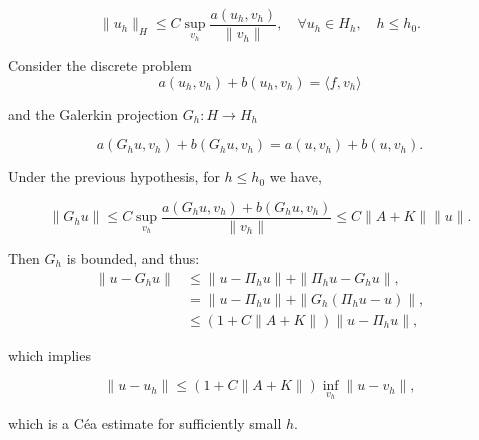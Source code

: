 \[\|u_h\|_H\leq C\sup_{v_h}\frac{a(u_h,v_h)}{\|v_h\|},\quad \forall u_h\in H_h, \quad h\leq h_0.\]

Consider the discrete problem
\[a(u_h,v_h) + b(u_h,v_h) = \langle f, v_h\rangle\]

and the Galerkin projection $G_h: H\to H_h$

\[a(G_hu, v_h) + b(G_hu, v_h) = a(u, v_h) + b(u,v_h).\]

Under the previous hypothesis, for $h\leq h_0$ we have, 

\[\|G_hu\|\leq C\sup_{v_h}\frac{a(G_hu, v_h) + b(G_hu, v_h)}{\|v_h\|}\leq C\|A+K\|\|u\|.\]

Then $G_h$ is bounded, and thus:
\begin{align*}
    \|u - G_hu\|&\leq \|u-\Pi_hu\| + \|\Pi_hu - G_hu\|,\\
    &= \|u-\Pi_hu\| + \|G_h(\Pi_hu - u)\|,\\
    &\leq (1+C\|A+K\|)\|u - \Pi_h u\|,
\end{align*}

which implies

\[\|u-u_h\|\leq (1+C\|A+K\|)\inf_{v_h}\|u-v_h\|,\] 

which is a Céa estimate for sufficiently small $h$.